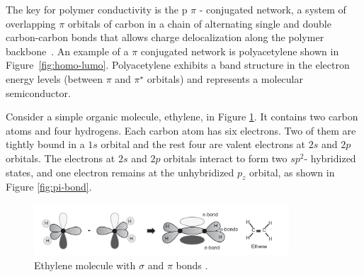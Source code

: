\par
The key for polymer conductivity is the p $\pi$ - conjugated network, a system of overlapping $\pi$ orbitals of carbon in a chain of alternating single and double carbon-carbon bonds that allows charge delocalization along the polymer backbone~\cite{heeger_polymers,Koehler_book,Casado_2021_book}. An example of a $\pi$ conjugated network is polyacetylene shown in Figure~\ref{fig:homo-lumo}. Polyacetylene exhibits a band structure in the electron energy levels (between $\pi$ and $\pi^\star$ orbitals) and represents a molecular semiconductor.\\

\par
Consider a simple organic molecule, ethylene, in Figure \ref{fig:ethylene}. It contains two carbon atoms and four hydrogens. Each carbon atom has six electrons. Two of them are tightly bound in a $1s$ orbital and the rest four are valent electrons at $2s$ and $2p$ orbitals. The electrons at $2s$ and $2p$ orbitals interact to form two $sp^2$- hybridized states, and one electron remains at the unhybridized $p_z$ orbital, as shown in Figure \ref{fig:pi-bond}. 

\begin{figure} [h]
\centering
\includegraphics[width = 0.85\textwidth]{./electrochemistry/figures/ethylene.png}
\caption{Ethylene molecule with $\sigma$ and $\pi$ bonds \cite{Koehler_book}.}
\label{fig:ethylene}
\end{figure}

